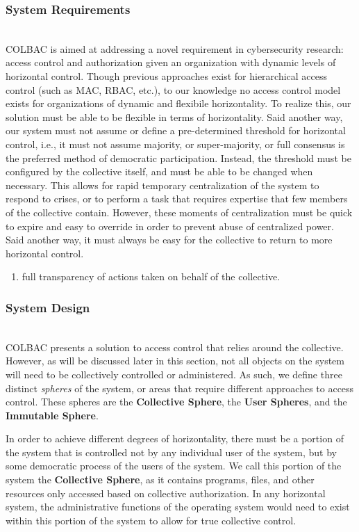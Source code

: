 \subsubsection{System Requirements}
\mbox{}\\
COLBAC is aimed at addressing a novel requirement in cybersecurity research:
access control and authorization given an organization with dynamic levels of
horizontal control. Though previous approaches exist for hierarchical access
control (such as MAC, RBAC, etc.), to our knowledge no access control model
exists for organizations of dynamic and flexibile horizontality. To realize
this, our solution must be able to be flexible in terms of horizontality. Said
another way, our system must not assume or define a pre-determined threshold for
horizontal control, i.e., it must not assume majority, or super-majority, or 
full consensus is the preferred method of democratic participation. Instead,
the threshold must be configured by the collective itself, and must be able to
be changed when necessary. This allows for rapid temporary centralization of the
system to respond to crises, or to perform a task that requires expertise that
few members of the collective contain. However, these moments of centralization
must be quick to expire and easy to override in order to prevent abuse of
centralized power. Said another way, it must always be easy for the collective
to return to more horizontal control.
\begin{enumerate}
\item full transparency of actions taken on behalf of the collective.
\end{enumerate}

\subsubsection{System Design}
\mbox{}\\
COLBAC presents a solution to access control that relies around the collective.
However, as will be discussed later in this section, not all objects on the
system will need to be collectively controlled or administered. As such, we
define three distinct \textit{spheres} of the system, or areas that require
different approaches to access control. These spheres are the \textbf{Collective
Sphere}, the \textbf{User Spheres}, and the \textbf{Immutable Sphere}.

In order to achieve different degrees of horizontality, there must be a portion
of the system that is controlled not by any individual user of the system, but
by some democratic process of the users of the system. We call this portion of
the system the \textbf{Collective Sphere}, as it contains programs, files, and
other resources only accessed based on collective authorization. In any
horizontal system, the administrative functions of the operating system would
need to exist within this portion of the system to allow for true collective
control.

